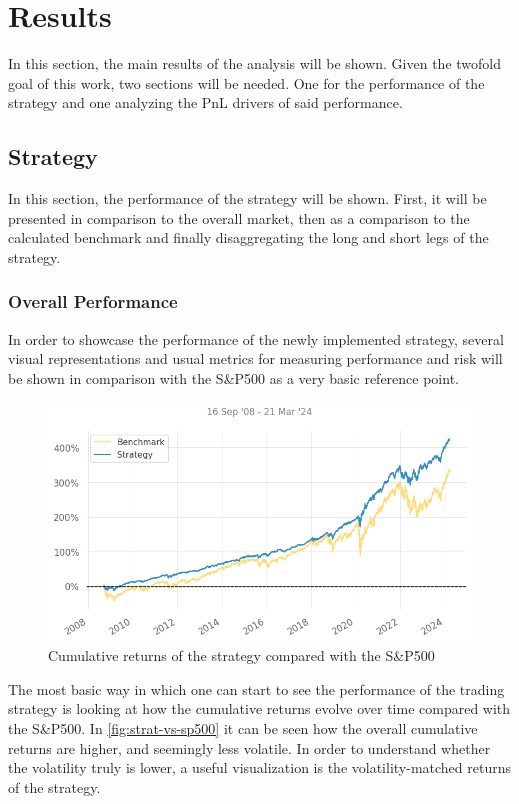 \section{Results}
In this section, the main results of the analysis will be shown. Given the twofold goal of this work, two sections will be needed. One for the performance of the strategy and one analyzing the PnL drivers of said performance. 

\subsection{Strategy}
In this section, the performance of the strategy will be shown. First, it will be presented in comparison to the overall market, then as a comparison to the calculated benchmark and finally disaggregating the long and short legs of the strategy. 

\subsubsection{Overall Performance}
\label{sec:overall-performance}
In order to showcase the performance of the newly implemented strategy, several visual representations and usual metrics for measuring performance and risk will be shown in comparison with the S\&P500 as a very basic reference point. 

\begin{figure}[ht]
    \includegraphics[width=\linewidth]{assets/strat-vs-sp500.png}
    \caption{Cumulative returns of the strategy compared with the S\&P500}
    \label{fig:strat-vs-sp500}
\end{figure}

The most basic way in which one can start to see the performance of the trading strategy is looking at how the cumulative returns evolve over time compared with the S\&P500. In \autoref{fig:strat-vs-sp500} it can be seen how the overall cumulative returns are higher, and seemingly less volatile. 
In order to understand whether the volatility truly is lower, a useful visualization is the volatility-matched returns of the strategy.

